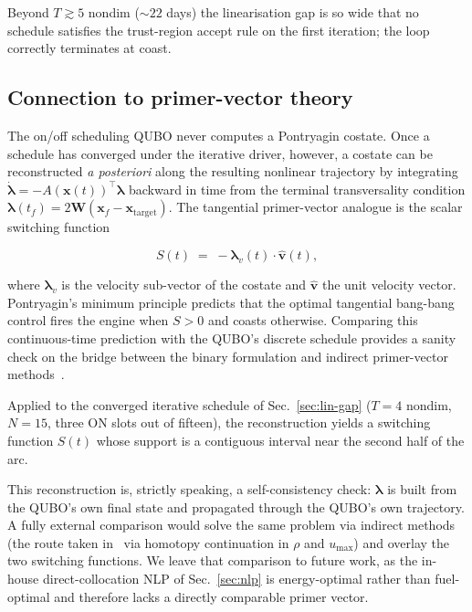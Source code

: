 \documentclass[11pt,a4paper]{article}
\theoremstyle{plain}
\newcommand{\bvec}[1]{\bm{#1}}
\newcommand{\xvec}{\bvec{x}}
\newcommand{\vvec}{\bvec{v}}
\newcommand{\Wmat}{\bvec{W}}
\begin{document}
Beyond $T \gtrsim 5$ nondim ($\sim 22$ days) the linearisation
gap is so wide that no schedule satisfies the trust-region accept
rule on the first iteration; the loop correctly terminates at
coast.

\subsection{Connection to primer-vector
  theory}\label{sec:primer-vector}

The on/off scheduling QUBO never computes a Pontryagin costate. Once a schedule has converged under the iterative driver,
however, a costate can be reconstructed \emph{a posteriori} along
the resulting nonlinear trajectory by integrating
\(\dot{\boldsymbol{\lambda}} = -A(\xvec(t))^\top
\boldsymbol{\lambda}\) backward in time from the terminal
transversality condition
\(\boldsymbol{\lambda}(t_f) = 2\Wmat(\xvec_f - \xvec_\mathrm{target})\).
The tangential primer-vector analogue is the scalar switching
function

\begin{equation}
S(t) \;=\; -\boldsymbol{\lambda}_v(t) \cdot \hat{\vvec}(t),
\label{eq:switching}
\end{equation}

where \(\boldsymbol{\lambda}_v\) is the velocity sub-vector of the
costate and \(\hat{\vvec}\) the unit velocity vector. Pontryagin's
minimum principle predicts that the optimal tangential bang-bang
control fires the engine when \(S > 0\) and coasts otherwise.
Comparing this continuous-time prediction with the QUBO's discrete
schedule provides a sanity check on the bridge between the binary
formulation and indirect primer-vector
methods~\cite{Taylor2026}.

Applied to the converged iterative schedule of
Sec.~\ref{sec:lin-gap} ($T = 4$ nondim, $N = 15$, three ON
slots out of fifteen), the reconstruction yields a switching
function \(S(t)\) whose support is a contiguous interval near
the second half of the arc.

This reconstruction is, strictly speaking, a self-consistency
check: \(\boldsymbol{\lambda}\) is built from the QUBO's own
final state and propagated through the QUBO's own trajectory.
A fully external comparison would solve the same problem via
indirect methods (the route taken in~\cite{Taylor2026} via
homotopy continuation in \(\rho\) and \(u_\mathrm{max}\)) and
overlay the two switching functions. We leave that comparison to
future work, as the in-house direct-collocation NLP of
Sec.~\ref{sec:nlp} is energy-optimal rather than fuel-optimal and
therefore lacks a directly comparable primer vector.
\end{document}
